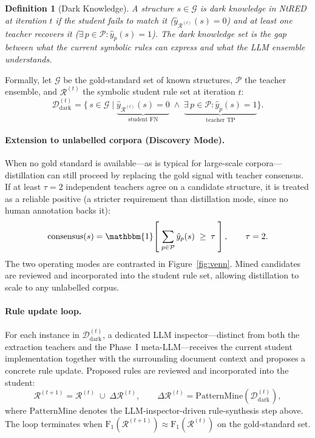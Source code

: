 \documentclass[11pt]{article}
\newtheorem{definition}{Definition}
\begin{document}
\begin{definition}[Dark Knowledge]
  A structure $s \in \mathcal{G}$ is \emph{dark knowledge} in NtRED at iteration $t$ if the
  student fails to match it ($\hat{y}_{\mathcal{R}^{(t)}}(s) = 0$) and at least one teacher
  recovers it ($\exists\, p \in \mathcal{P} : \hat{y}_{p}(s) = 1$). The dark knowledge set
  is the gap between what the current symbolic rules can express and what the LLM ensemble
  understands.
\end{definition}

Formally, let $\mathcal{G}$ be the gold-standard set of known structures, $\mathcal{P}$ the
teacher ensemble, and $\mathcal{R}^{(t)}$ the symbolic student rule set at iteration $t$:
%
\begin{equation}
  \mathcal{D}_{\mathrm{dark}}^{(t)}
    = \bigl\{\, s \in \mathcal{G}
        \;\big|\;
        \underbrace{\hat{y}_{\mathcal{R}^{(t)}}(s) = 0}_{\text{student FN}}
        \;\wedge\;
        \underbrace{\exists\, p \in \mathcal{P} : \hat{y}_{p}(s) = 1}_{\text{teacher TP}}
      \bigr\}.
\end{equation}
%
\paragraph{Extension to unlabelled corpora (Discovery Mode).}
When no gold standard is available---as is typical for large-scale corpora---distillation
can still proceed by replacing the gold signal with teacher consensus. If at least $\tau = 2$
independent teachers agree on a candidate structure, it is treated as a reliable positive
(a stricter requirement than distillation mode, since no human annotation backs it):
%
\begin{equation}
  \mathrm{consensus}(s)
    = \mathbbm{1}\!\left[\;\sum_{p \in \mathcal{P}} \hat{y}_{p}(s) \;\geq\; \tau\;\right],
    \qquad \tau = 2.
\end{equation}
%
The two operating modes are contrasted in Figure~\ref{fig:venn}. Mined candidates are
reviewed and incorporated into the student rule set, allowing distillation to scale to any
unlabelled corpus.

\paragraph{Rule update loop.}
For each instance in $\mathcal{D}_{\mathrm{dark}}^{(t)}$, a dedicated LLM
inspector---distinct from both the extraction teachers and the Phase~I meta-LLM---receives the
current student implementation together with the surrounding document context and proposes a
concrete rule update. Proposed rules are reviewed and incorporated into the student:
%
\begin{equation}
  \mathcal{R}^{(t+1)}
    = \mathcal{R}^{(t)} \;\cup\; \Delta\mathcal{R}^{(t)},
  \qquad
  \Delta\mathcal{R}^{(t)} = \mathrm{PatternMine}\!\left(\mathcal{D}_{\mathrm{dark}}^{(t)}\right),
\end{equation}
%
where $\mathrm{PatternMine}$ denotes the LLM-inspector-driven rule-synthesis step above.
The loop terminates when $\mathrm{F_1}(\mathcal{R}^{(t+1)}) \approx \mathrm{F_1}(\mathcal{R}^{(t)})$
on the gold-standard set.
\end{document}
